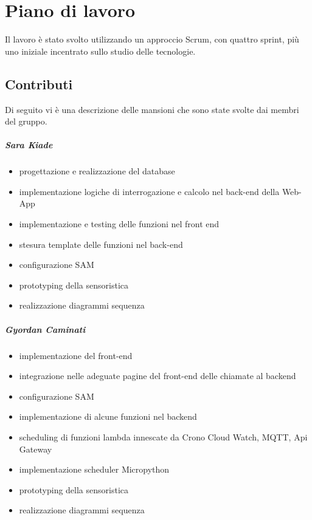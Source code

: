 \chapter{Piano di lavoro}
Il lavoro è stato svolto utilizzando un approccio Scrum, con quattro sprint, più uno iniziale incentrato sullo studio delle tecnologie.
\section{Contributi}
Di seguito vi è una descrizione delle mansioni che sono state svolte dai membri del gruppo.
\paragraph{Sara Kiade} 
\begin{itemize}
    \item progettazione e realizzazione del database
    \item implementazione logiche di interrogazione e calcolo nel back-end della Web-App
    \item implementazione e testing delle funzioni nel front end 
    \item stesura template delle funzioni nel back-end
    \item configurazione SAM
    \item prototyping della sensoristica
    \item realizzazione diagrammi sequenza
\end{itemize}

\paragraph{Gyordan Caminati}
\begin{itemize}
    \item implementazione del front-end
    \item integrazione nelle adeguate pagine del front-end delle chiamate al backend 
    \item configurazione SAM
    \item implementazione di alcune funzioni nel backend
    \item scheduling di funzioni lambda innescate da Crono Cloud Watch, MQTT, Api Gateway
    \item implementazione scheduler Micropython
    \item prototyping della sensoristica
    \item realizzazione diagrammi sequenza
\end{itemize}
